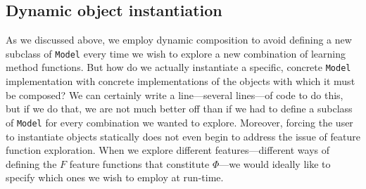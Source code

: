 \documentclass[a4paper]{article}
\begin{document}



























\subsection{Dynamic object instantiation}

As we discussed above, we employ dynamic composition to avoid defining
a new subclass of \texttt{Model} every time we wish to explore a new
combination of learning method functions. But how do we actually instantiate
a specific, concrete \texttt{Model} implementation with concrete implementations
of the objects with which it must be composed? We can certainly write
a line---several lines---of code to do this, but if we do that, we
are not much better off than if we had to define a subclass of \texttt{Model}
for every combination we wanted to explore. Moreover, forcing the
user to instantiate objects statically does not even begin to address
the issue of feature function exploration. When we explore different
features---different ways of defining the $F$ feature functions that
constitute $\Phi$---we would ideally like to specify which ones we
wish to employ at run-time.
\end{document}
